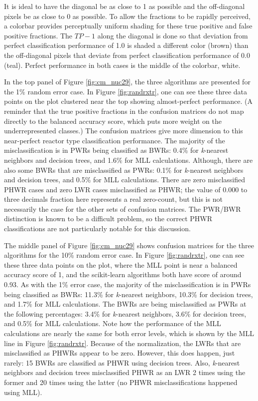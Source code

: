 It is ideal to have the diagonal be as close to 1 as possible and the
off-diagonal pixels be as close to 0 as possible.  To allow the fractions to be
rapidly perceived, a colorbar provides perceptually uniform shading for these
true positive and false positive fractions.  The $TP - 1$ along the diagonal is
done so that deviation from perfect classification performance of 1.0 is shaded
a different color (brown) than the off-diagonal pixels that deviate from
perfect classification performance of 0.0 (teal). Perfect performance in both
cases is the middle of the colorbar, white.  

In the top panel of Figure \ref{fig:cm_nuc29}, the three algorithms are
presented for the 1\% random error case. In Figure \ref{fig:randrxtr}, one can
see these three data points on the plot clustered near the top showing
almost-perfect performance.  (A reminder that the true positive fractions in
the confusion matrices do not map directly to the balanced accuracy score,
which puts more weight on the underrepresented classes.) The confusion matrices
give more dimension to this near-perfect reactor type classification
performance. The majority of the misclassification is in \gls{PWR}s being
classified as \gls{BWR}s: 0.4\% for \textit{k}-nearest neighbors and decision
trees, and 1.6\% for \gls{MLL} calculations. Although, there are also some
\gls{BWR}s that are misclassified as \gls{PWR}s: 0.1\% for \textit{k}-nearest
neighbors and decision trees, and 0.5\% for \gls{MLL} calculations.  There are
zero misclassified \gls{PHWR} cases and zero \gls{LWR} cases misclassified as
\gls{PHWR}; the value of 0.000 to three decimals fraction here represents a
real zero-count, but this is not necessarily the case for the other sets of
confusion matrices.  The \gls{PWR}/\gls{BWR} distinction is known to be a
difficult problem, so the correct \gls{PHWR} classifications are not
particularly notable for this discussion. 

The middle panel of Figure \ref{fig:cm_nuc29} shows confusion matrices for the
three algorithms for the 10\% random error case. In Figure \ref{fig:randrxtr},
one can see these three data points on the plot, where the \gls{MLL} point is
near a balanced accuracy score of 1, and the scikit-learn algorithms both have
score of around 0.93. As with the 1\% error case, the majority of the
misclassification is in \gls{PWR}s being classified as \gls{BWR}s: 11.3\% for
\textit{k}-nearest neighbors, 10.3\% for decision trees, and 1.7\% for
\gls{MLL} calculations.  The \gls{BWR}s are being misclassified as \gls{PWR}s
at the following percentages: 3.4\% for \textit{k}-nearest neighbors, 3.6\% for
decision trees, and 0.5\% for \gls{MLL} calculations. Note how the performance
of the \gls{MLL} calculations are nearly the same for both error levels, which
is shown by the \gls{MLL} line in Figure \ref{fig:randrxtr}. Because of the
normalization, the \gls{LWR}s that are misclassified as \gls{PHWR}s appear to
be zero. However, this does happen, just rarely: 15 \gls{BWR}s are classified
as \gls{PHWR} using decision trees. Also, \textit{k}-nearest neighbors and
decision trees misclassified \gls{PHWR} as an \gls{LWR} 2 times using the
former and 20 times using the latter (no \gls{PHWR} misclassifications happened
using \gls{MLL}).

